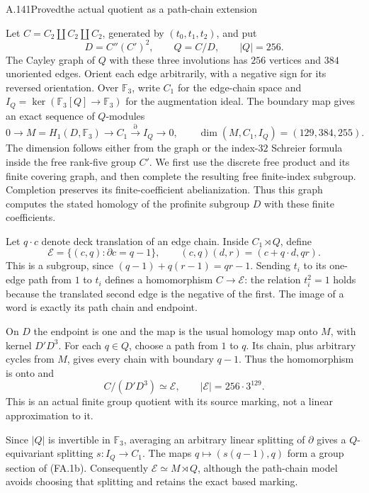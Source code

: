 \begin{statement}{A.141}{Proved}{the actual quotient as a path-chain extension}
\end{statement}
Let $C=C_2\amalg C_2\amalg C_2$, generated by
$(t_0,t_1,t_2)$, and put
\[
 D=C''(C')^2,\qquad Q=C/D,\qquad |Q|=256.
\]
The Cayley graph of $Q$ with these three involutions
has $256$ vertices and $384$ unoriented edges.
Orient each edge arbitrarily, with a negative sign
for its reversed orientation. Over $\mathbb F_3$,
write $C_1$ for the edge-chain space and
$I_Q=\ker(\mathbb F_3[Q]\to\mathbb F_3)$ for the
augmentation ideal. The boundary map gives an exact
sequence of $Q$-modules
\[
 0\longrightarrow M=H_1(D,\mathbb F_3)
 \longrightarrow C_1\stackrel{\partial}{\longrightarrow}
 I_Q\longrightarrow0,
 \qquad \dim(M,C_1,I_Q)=(129,384,255).
 \tag{FA.1a}
\]
The dimension follows either from the graph or the
index-$32$ Schreier formula inside the free rank-five
group $C'$. We first use the discrete free product and its
finite covering graph, and then complete the resulting
free finite-index subgroup. Completion preserves its
finite-coefficient abelianization. Thus this graph
computes the stated homology of the profinite subgroup
$D$ with these finite coefficients.

Let $q\cdot c$ denote deck translation of an edge chain.
Inside $C_1\rtimes Q$, define
\[
 \mathcal E=\{(c,q):\partial c=q-1\},\qquad
 (c,q)(d,r)=(c+q\cdot d,qr).
 \tag{FA.1b}
\]
This is a subgroup, since
$(q-1)+q(r-1)=qr-1$. Sending $t_i$ to its one-edge
path from $1$ to $t_i$ defines a homomorphism
$C\to\mathcal E$: the relation $t_i^2=1$ holds
because the translated second edge is the negative
of the first. The image of a word is exactly its
path chain and endpoint.

On $D$ the endpoint is one and the map is the usual
homology map onto $M$, with kernel $D'D^3$. For each
$q\in Q$, choose a path from $1$ to $q$. Its chain,
plus arbitrary cycles from $M$, gives every chain
with boundary $q-1$. Thus the homomorphism is onto
and
\[
       \boxed{\ C/(D'D^3)\simeq\mathcal E,\qquad
                    |\mathcal E|=256\cdot3^{129}.\ }
 \tag{FA.1c}
\]
This is an actual finite group quotient with its
source marking, not a linear approximation to it.

Since $|Q|$ is invertible in $\mathbb F_3$, averaging
an arbitrary linear splitting of $\partial$ gives
a $Q$-equivariant splitting $s:I_Q\to C_1$.
The maps $q\mapsto(s(q-1),q)$ form a group section
of (FA.1b). Consequently $\mathcal E\simeq M\rtimes Q$,
although the path-chain model avoids choosing that
splitting and retains the exact based marking.

